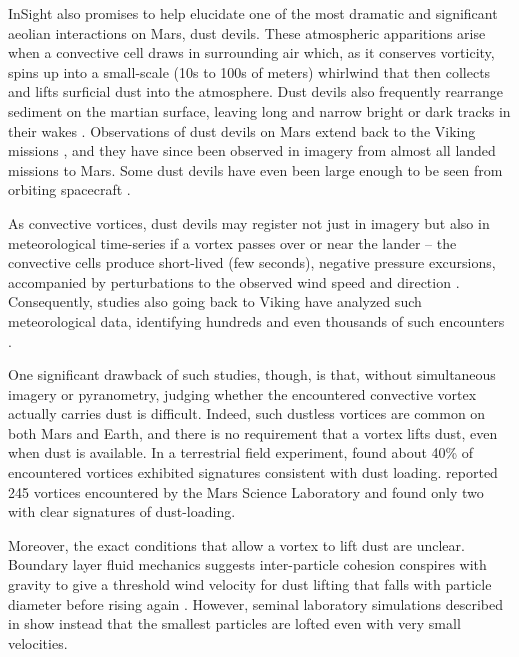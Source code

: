 \documentclass[linenumbers,trackchanges]{aastex63}
\begin{document}
InSight also promises to help elucidate one of the most dramatic and significant aeolian interactions on Mars, dust devils. These atmospheric apparitions arise when a convective cell draws in surrounding air which, as it conserves vorticity, spins up into a small-scale (10s to 100s of meters) whirlwind that then collects and lifts surficial dust into the atmosphere. Dust devils also frequently rearrange sediment on the martian surface, leaving long and narrow bright or dark tracks in their wakes \citep{2016SSRv..203..143R}. Observations of dust devils on Mars extend back to the Viking missions \citep{1985Sci...230..175T}, and they have since been observed in imagery from almost all landed missions to Mars. Some dust devils have even been large enough to be seen from orbiting spacecraft \citep[\emph{e.g.},][]{2011GeoRL..3824206C}.

As convective vortices, dust devils may register not just in imagery but also in meteorological time-series if a vortex passes over or near the lander -- the convective cells produce short-lived (few seconds), negative pressure excursions, accompanied by perturbations to the observed wind speed and direction \citep{2016Icar..271..326L}. Consequently, studies also going back to Viking have analyzed such meteorological data, identifying hundreds and even thousands of such encounters .

One significant drawback of such studies, though, is that, without simultaneous imagery or pyranometry, judging whether the encountered convective vortex actually carries dust is difficult. Indeed, such dustless vortices are common on both Mars and Earth, and there is no requirement that a vortex lifts dust, even when dust is available. In a terrestrial field experiment, \citet{LORENZ20151} found about 40\% of encountered vortices exhibited signatures consistent with dust loading. \citet{2016Icar..278..180S} reported 245 vortices encountered by the Mars Science Laboratory and found only two with clear signatures of dust-loading. 

Moreover, the exact conditions that allow a vortex to lift dust are unclear. Boundary layer fluid mechanics suggests inter-particle cohesion conspires with gravity to give a threshold wind velocity for dust lifting that falls with particle diameter before rising again \citep{1985wagp.book.....G}. However, seminal laboratory simulations described in \citet{2010Icar..206..306N} show instead that the smallest particles are lofted even with very small velocities. 
\end{document}
